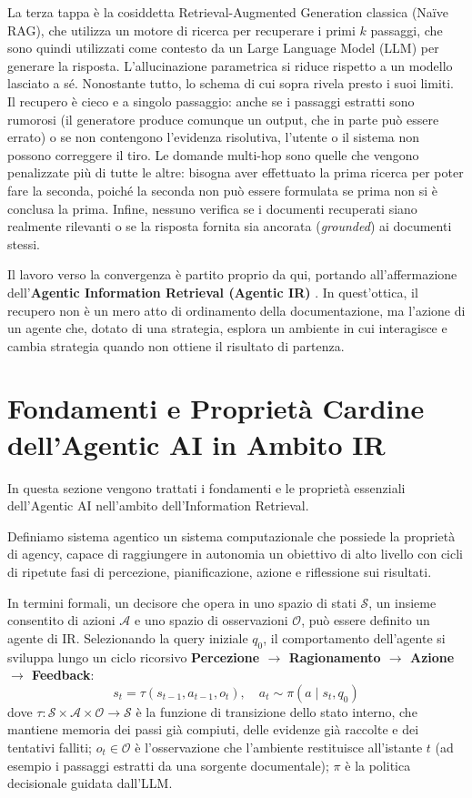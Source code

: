 La terza tappa è la cosiddetta Retrieval-Augmented Generation classica (Naïve RAG), che utilizza un motore di ricerca per recuperare i primi $k$ passaggi, che sono quindi utilizzati come contesto da un Large Language Model (LLM) per generare la risposta. L'allucinazione parametrica si riduce rispetto a un modello lasciato a sé. Nonostante tutto, lo schema di cui sopra rivela presto i suoi limiti. Il recupero è cieco e a singolo passaggio: anche se i passaggi estratti sono rumorosi (il generatore produce comunque un output, che in parte può essere errato) o se non contengono l'evidenza risolutiva, l'utente o il sistema non possono correggere il tiro. Le domande multi-hop sono quelle che vengono penalizzate più di tutte le altre: bisogna aver effettuato la prima ricerca per poter fare la seconda, poiché la seconda non può essere formulata se prima non si è conclusa la prima. Infine, nessuno verifica se i documenti recuperati siano realmente rilevanti o se la risposta fornita sia ancorata (\textit{grounded}) ai documenti stessi.

Il lavoro verso la convergenza è partito proprio da qui, portando all'affermazione dell'\textbf{Agentic Information Retrieval (Agentic IR)} \cite{zhang2024ai, wu2025agentic}. In quest'ottica, il recupero non è un mero atto di ordinamento della documentazione, ma l'azione di un agente che, dotato di una strategia, esplora un ambiente in cui interagisce e cambia strategia quando non ottiene il risultato di partenza.

\section{Fondamenti e Proprietà Cardine dell'Agentic AI in Ambito IR}
\label{sec:fondamenti_agentic}

In questa sezione vengono trattati i fondamenti e le proprietà essenziali dell'Agentic AI nell'ambito dell'Information Retrieval.

Definiamo sistema agentico un sistema computazionale che possiede la proprietà di agency, capace di raggiungere in autonomia un obiettivo di alto livello con cicli di ripetute fasi di percezione, pianificazione, azione e riflessione sui risultati.

In termini formali, un decisore che opera in uno spazio di stati $\mathcal{S}$, un insieme consentito di azioni $\mathcal{A}$ e uno spazio di osservazioni $\mathcal{O}$, può essere definito un agente di IR. Selezionando la query iniziale $q_0$, il comportamento dell'agente si sviluppa lungo un ciclo ricorsivo \textbf{Percezione $\rightarrow$ Ragionamento $\rightarrow$ Azione $\rightarrow$ Feedback}:
\begin{equation}
s_t = \tau(s_{t-1}, a_{t-1}, o_t), \quad a_t \sim \pi(a \mid s_t, q_0)
\end{equation}
dove $\tau: \mathcal{S} \times \mathcal{A} \times \mathcal{O} \rightarrow \mathcal{S}$ è la funzione di transizione dello stato interno, che mantiene memoria dei passi già compiuti, delle evidenze già raccolte e dei tentativi falliti; $o_t \in \mathcal{O}$ è l'osservazione che l'ambiente restituisce all'istante $t$ (ad esempio i passaggi estratti da una sorgente documentale); $\pi$ è la politica decisionale guidata dall'LLM.

